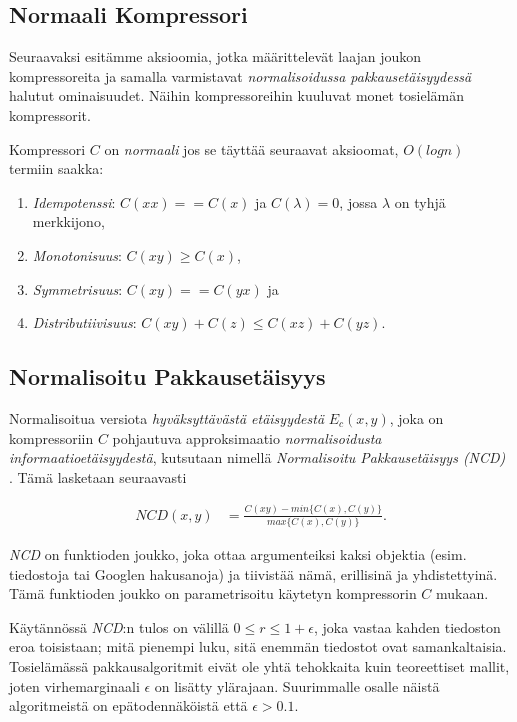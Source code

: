 \documentclass[11pt,finnish]{tktltiki2}
\theoremstyle{definition}
\theoremstyle{remark}
\begin{document}
\subsection{Normaali Kompressori} %
\label{sub:normaali_kompressori}

  Seuraavaksi esitämme aksioomia, jotka määrittelevät laajan joukon kompressoreita ja samalla varmistavat \emph{normalisoidussa pakkausetäisyydessä} halutut ominaisuudet. Näihin kompressoreihin kuuluvat monet tosielämän kompressorit.

  Kompressori $C$ on \emph{normaali} jos se täyttää seuraavat aksioomat, $O(log n)$ termiin saakka:

  \begin{enumerate}
    \item \emph{Idempotenssi}: $C(xx) == C(x)$ ja $C(\lambda) = 0$, jossa $\lambda$ on tyhjä merkkijono,
    \item \emph{Monotonisuus}: $C(xy) \geq C(x)$,
    \item \emph{Symmetrisuus}: $C(xy) == C(yx)$ ja
    \item \emph{Distributiivisuus}: $C(xy) + C(z) \leq C(xz) + C(yz)$.
  \end{enumerate}

\subsection{Normalisoitu Pakkausetäisyys} %
\label{sub:normalisoitu_pakkauset_isyys}

  Normalisoitua versiota \emph{hyväksyttävästä etäisyydestä} $E_c(x,y)$, joka on kompressoriin $C$ pohjautuva approksimaatio \emph{normalisoidusta informaatioetäisyydestä}, kutsutaan nimellä \emph{Normalisoitu Pakkausetäisyys (NCD)} \cite{CV05}. Tämä lasketaan seuraavasti

  \begin{align}
    NCD(x,y) &= \frac{C(xy)-min\{C(x),C(y)\}}{max\{C(x),C(y)\}}.
  \end{align}

  \emph{NCD} on funktioden joukko, joka ottaa argumenteiksi kaksi objektia (esim. tiedostoja tai Googlen hakusanoja) ja tiivistää nämä, erillisinä ja yhdistettyinä. Tämä funktioden joukko on parametrisoitu käytetyn kompressorin $C$ mukaan.

  Käytännössä \emph{NCD}:n tulos on välillä $0 \leq r \leq 1+ \epsilon$, joka vastaa kahden tiedoston eroa toisistaan; mitä pienempi luku, sitä enemmän tiedostot ovat samankaltaisia. Tosielämässä pakkausalgoritmit eivät ole yhtä tehokkaita kuin teoreettiset mallit, joten virhemarginaali $\epsilon$ on lisätty ylärajaan. Suurimmalle osalle näistä algoritmeistä on epätodennäköistä että  $\epsilon > 0.1$.
\end{document}
